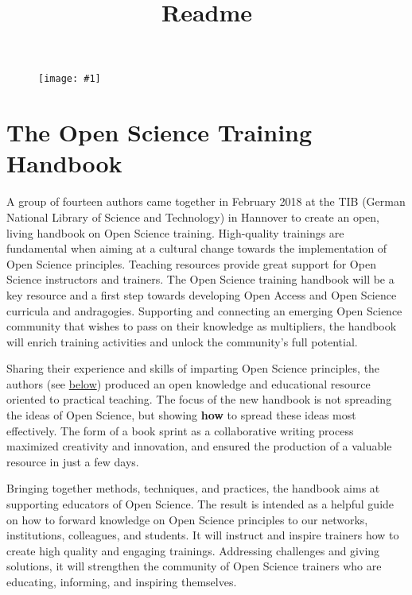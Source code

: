 \documentclass{article}
\newlength{\imgwidth}
\newcommand\scaledgraphics[2]{%
                
\settowidth{\imgwidth}{\texttt{[image: \#1]}}%
                
\setlength{\imgwidth}{\minof{\imgwidth}{#2\textwidth}}%
                
\texttt{[image: \#1]}%
                
}
\begin{document}
\title{Readme}

\maketitle

\begin{figure}
\scaledgraphics{83db2204-7fbd-4954-bbf7-95dbd6ff4efa.png}{1}
\label{F89189351}
\end{figure}


\section{The Open Science Training Handbook}\label{H9514896}



A group of fourteen authors came together in February 2018 at the TIB (German National Library of Science and Technology) in Hannover to create an open, living handbook on Open Science training. High-quality trainings are fundamental when aiming at a cultural change towards the implementation of Open Science principles. Teaching resources provide great support for Open Science instructors and trainers. The Open Science training handbook will be a key resource and a first step towards developing Open Access and Open Science curricula and andragogies. Supporting and connecting an emerging Open Science community that wishes to pass on their knowledge as multipliers, the handbook will enrich training activities and unlock the community’s full potential.


Sharing their experience and skills of imparting Open Science principles, the authors (see \href{https://book.fosteropenscience.eu/en/#the-authors-and-the-book-sprint-facilitators}{below}) produced an open knowledge and educational resource oriented to practical teaching. The focus of the new handbook is not spreading the ideas of Open Science, but showing \textbf{how} to spread these ideas most effectively. The form of a book sprint as a collaborative writing process maximized creativity and innovation, and ensured the production of a valuable resource in just a few days.


Bringing together methods, techniques, and practices, the handbook aims at supporting educators of Open Science. The result is intended as a helpful guide on how to forward knowledge on Open Science principles to our networks, institutions, colleagues, and students. It will instruct and inspire trainers how to create high quality and engaging trainings. Addressing challenges and giving solutions, it will strengthen the community of Open Science trainers who are educating, informing, and inspiring themselves.
\end{document}
